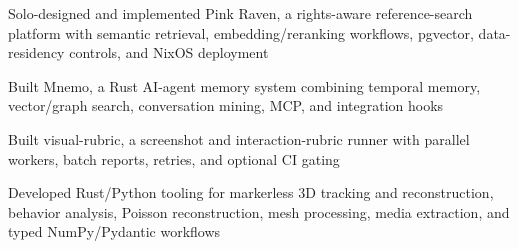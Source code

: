 {  \cvRoleBreak
  \begin{cvitems}
    \item Solo-designed and implemented Pink Raven, a rights-aware reference-search platform with semantic retrieval, embedding/reranking workflows, pgvector, data-residency controls, and NixOS deployment
    \item Built Mnemo, a Rust AI-agent memory system combining temporal memory, vector/graph search, conversation mining, MCP, and integration hooks
  \end{cvitems}

  \cvRoleBreak
  \begin{cvitems}
    \item Built visual-rubric, a screenshot and interaction-rubric runner with parallel workers, batch reports, retries, and optional CI gating
  \end{cvitems}

  \cvRoleBreak
  \begin{cvitems}
    \item Developed Rust/Python tooling for markerless 3D tracking and reconstruction, behavior analysis, Poisson reconstruction, mesh processing, media extraction, and typed NumPy/Pydantic workflows
  \end{cvitems}
}

